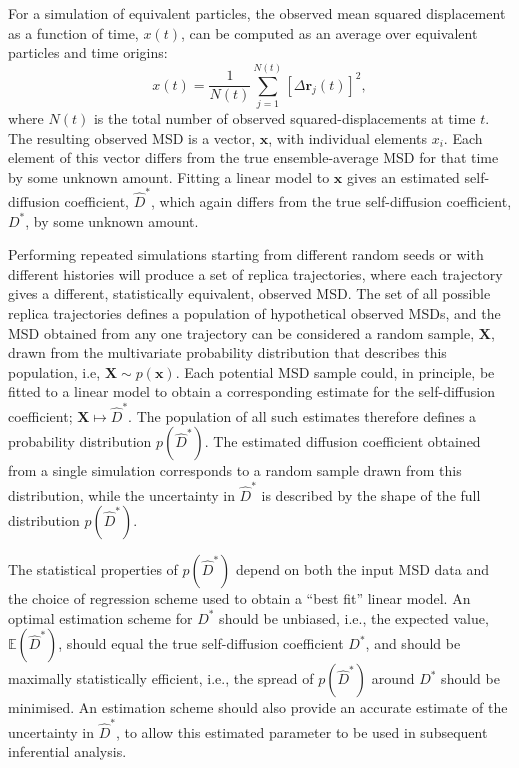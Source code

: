 \documentclass[reprint,superscriptaddress,nobibnotes,amsmath,amssymb,aps,prx,hidelinks]{revtex4-2}
\newcommand{\oMSD}{\ensuremath{\bm{x}}}
\newcommand{\oMSDs}[1]{\ensuremath{x}(#1)}
\newcommand{\oMSDi}{\ensuremath{x_i}}
\newcommand{\prob}[1]{\ensuremath{p(#1)}}
\newcommand{\Dest}{\ensuremath{\widehat{D}^*}}
\newcommand{\D}{\ensuremath{D^*}}
\begin{document}
For a simulation of equivalent particles, the observed mean squared displacement as a function of time, $\oMSDs{t}$, can be computed as an average over equivalent particles and time origins:
%
\begin{equation}
  \oMSDs{t} = \frac{1}{N(t)}\sum^{N(t)}_{j=1}{\left[\Delta\mathbf{r}_j(t)\right]}^2,
  \label{equ:observed_msd}
\end{equation}
%
where $N(t)$ is the total number of observed squared-displacements at time $t$.
The resulting observed MSD is a vector, $\oMSD$, with individual elements $\oMSDi$.
Each element of this vector differs from the true ensemble-average MSD for that time by some unknown amount.
Fitting a linear model to $\oMSD$ gives an estimated self-diffusion coefficient, $\Dest$, which again differs from the true self-diffusion coefficient, $\D$, by some unknown amount.

Performing repeated simulations starting from different random seeds or with different histories will produce a set of replica trajectories, where each trajectory gives a different, statistically equivalent, observed MSD.
The set of all possible replica trajectories defines a population of hypothetical observed MSDs, and the MSD obtained from any one trajectory can be considered a random sample, $\bm{X}$, drawn from the multivariate probability distribution that describes this population, i.e, $\bm{X} \sim \prob{\oMSD}$.
Each potential MSD sample could, in principle, be fitted to a linear model to obtain a corresponding estimate for the self-diffusion coefficient; $\bm{X} \mapsto \Dest$.
The population of all such estimates therefore defines a probability distribution $\prob{\Dest}$.
The estimated diffusion coefficient obtained from a single simulation corresponds to a random sample drawn from this distribution, while the uncertainty in $\Dest$ is described by the shape of the full distribution $\prob{\Dest}$.

The statistical properties of $p(\Dest)$ depend on both the input MSD data and the choice of regression scheme used to obtain a ``best fit'' linear model.
An optimal estimation scheme for $\D$ should be unbiased, i.e., the expected value, $\mathbb{E}(\Dest)$, should equal the true self-diffusion coefficient $\D$, and should be maximally statistically efficient, i.e., the spread of $p(\Dest)$ around $\D$ should be minimised.
An estimation scheme should also provide an accurate estimate of the uncertainty in $\Dest$, to allow this estimated parameter to be used in subsequent inferential analysis.
\end{document}
